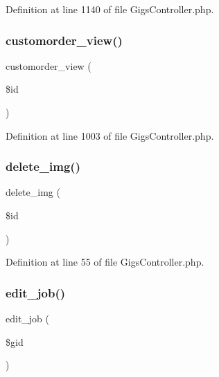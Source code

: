 Definition at line 1140 of file Gigs\+Controller.\+php.

\mbox{\label{class_responsive_1_1_http_1_1_controllers_1_1_gigs_controller_af645df080dbc48a9ce0fcacb6b31b7db}} 
\subsubsection{\texorpdfstring{customorder\_view()}{customorder\_view()}}
{\footnotesize\ttfamily customorder\+\_\+view (\begin{DoxyParamCaption}\item[{}]{\$id }\end{DoxyParamCaption})}



Definition at line 1003 of file Gigs\+Controller.\+php.

\mbox{\label{class_responsive_1_1_http_1_1_controllers_1_1_gigs_controller_a0b688002d24e9c1235aa0c96456e28b4}} 
\subsubsection{\texorpdfstring{delete\_img()}{delete\_img()}}
{\footnotesize\ttfamily delete\+\_\+img (\begin{DoxyParamCaption}\item[{}]{\$id }\end{DoxyParamCaption})}



Definition at line 55 of file Gigs\+Controller.\+php.

\mbox{\label{class_responsive_1_1_http_1_1_controllers_1_1_gigs_controller_aa3d2f009255ad0614e23fd165aa9b332}} 
\subsubsection{\texorpdfstring{edit\_job()}{edit\_job()}}
{\footnotesize\ttfamily edit\+\_\+job (\begin{DoxyParamCaption}\item[{}]{\$gid }\end{DoxyParamCaption})}



